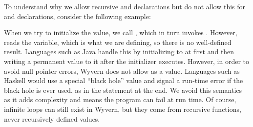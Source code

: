 \documentclass{article}
\begin{document}
\begin{mdP}[class={indent},data-line={439}]%
{}To understand why we allow recursive %
{}%
{} and %
{}%
{} declarations
but do not allow this for %
{}%
{} and %
{}%
{} declarations, consider
the following example:%
\end{mdP}%
\begin{mdPre}[class={para-block,pre-indented},data-line={443}]%
%
\end{mdPre}%
\begin{mdP}[data-line={453}]%
{}When we try to initialize the %
{}%
{} value, we call %
{}%
{}, which in
turn invokes %
{}%
{}.  However, %
{}%
{} reads the %
{}%
{} variable, which
is what we are defining, so there is no well-defined result.  Languages
such as Java handle this by initializing %
{}%
{} to %
{}%
{} at first and
then writing a permanent value to it after the initializer executes.
However, in order to avoid null pointer errors, Wyvern does not allow
{}%
{} as a value.  Languages such as Haskell would use a special
{}{\textquotedblleft}black hole{\textquotedblright}%
{} value and signal a run-time error if the black hole is
ever used, as in the %
{}%
{} statement at the end.
We avoid this semantics as it adds complexity and means the
program can fail at run time.  Of course, infinite loops can still
exist in Wyvern, but they come from recursive functions, never
recursively defined values.%
\end{mdP}%
\end{document}
